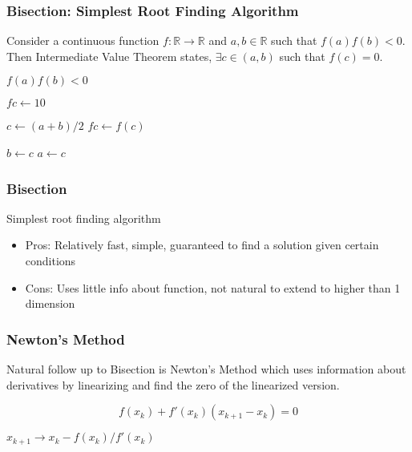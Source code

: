 \documentclass[10pt]{beamer}
\begin{document}
\begin{frame} \frametitle{Bisection: Simplest Root Finding Algorithm}

  Consider a continuous function $f : \mathbb{R} \rightarrow \mathbb{R}$ and $a, b \in \mathbb{R}$ such that $f(a) f(b) < 0$. Then Intermediate Value Theorem states, $\exists c \in (a, b)$ such that $f(c)  = 0$.

  \vspace{0.3cm}

  \begin{algorithmic}
    \REQUIRE $f(a) f(b) < 0$

    \STATE $fc \leftarrow 10$

      \STATE $c \leftarrow (a+b)/2$
      \STATE $fc \leftarrow f(c)$

        \STATE $b \leftarrow c$
      \ELSE
        \STATE $a \leftarrow c$
      \ENDIF
    \ENDWHILE

  \end{algorithmic}

\end{frame}

\begin{frame} \frametitle{Bisection}
  Simplest root finding algorithm
  \begin{itemize}
    \item Pros: Relatively fast, simple, guaranteed to find a solution given certain conditions
    \item Cons: Uses little info about function, not natural to extend to higher than 1 dimension
  \end{itemize}
\end{frame}

\begin{frame} \frametitle{Newton's Method}

  Natural follow up to Bisection is Newton's Method which uses information about derivatives by linearizing and find the zero of the linearized version.

  $$f(x_k) + f'(x_k) (x_{k+1} - x_{k}) = 0$$

  \vspace{0.5cm}

  \begin{algorithmic}
      \STATE $x_{k+1} \rightarrow x_k - f(x_k)/f'(x_k)$
    \ENDWHILE

  \end{algorithmic}

\end{frame}
\end{document}
